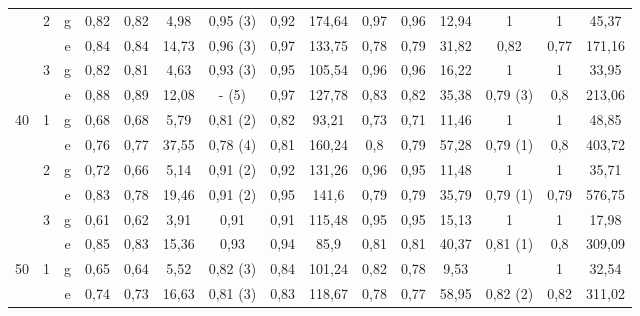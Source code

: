 \begin{table}[htbp]
{\begin{tabular}{|c|c|c|ccc|ccc|ccc|ccc|}
\cline{2-15}          & \multirow{2}[2]{*}{2} & g     & 0,82  & 0,82  & 4,98  & \textcolor[rgb]{ 1,  0,  0}{0,95 (3)} & 0,92  & 174,64 & 0,97  & 0,96  & 12,94 & 1     & 1     & 45,37 \bigstrut[t]\\
          &       & e     & 0,84  & 0,84  & 14,73 & \textcolor[rgb]{ 1,  0,  0}{0,96 (3)} & 0,97  & 133,75 & 0,78  & 0,79  & 31,82 & 0,82  & 0,77  & 171,16 \bigstrut[b]\\
\cline{2-15}          & \multirow{2}[2]{*}{3} & g     & 0,82  & 0,81  & 4,63  & \textcolor[rgb]{ 1,  0,  0}{0,93 (3)} & 0,95  & 105,54 & 0,96  & 0,96  & 16,22 & 1     & 1     & 33,95 \bigstrut[t]\\
          &       & e     & 0,88  & 0,89  & 12,08 & \textcolor[rgb]{ 1,  0,  0}{- (5)} & 0,97  & 127,78 & 0,83  & 0,82  & 35,38 & \textcolor[rgb]{ 1,  0,  0}{0,79 (3)} & 0,8   & 213,06 \bigstrut[b]\\
    \hline
    \hline
    \multirow{6}[6]{*}{40} & \multirow{2}[2]{*}{1} & g     & 0,68  & 0,68  & 5,79  & \textcolor[rgb]{ 1,  0,  0}{0,81 (2)} & 0,82  & 93,21 & 0,73  & 0,71  & 11,46 & 1     & 1     & 48,85 \bigstrut[t]\\
          &       & e     & 0,76  & 0,77  & 37,55 & \textcolor[rgb]{ 1,  0,  0}{0,78 (4)} & 0,81  & 160,24 & 0,8   & 0,79  & 57,28 & \textcolor[rgb]{ 1,  0,  0}{0,79 (1)} & 0,8   & 403,72 \bigstrut[b]\\
\cline{2-15}          & \multirow{2}[2]{*}{2} & g     & 0,72  & 0,66  & 5,14  & \textcolor[rgb]{ 1,  0,  0}{0,91 (2)} & 0,92  & 131,26 & 0,96  & 0,95  & 11,48 & 1     & 1     & 35,71 \bigstrut[t]\\
          &       & e     & 0,83  & 0,78  & 19,46 & \textcolor[rgb]{ 1,  0,  0}{0,91 (2)} & 0,95  & 141,6 & 0,79  & 0,79  & 35,79 & \textcolor[rgb]{ 1,  0,  0}{0,79 (1)} & 0,79  & 576,75 \bigstrut[b]\\
\cline{2-15}          & \multirow{2}[2]{*}{3} & g     & 0,61  & 0,62  & 3,91  & 0,91  & 0,91  & 115,48 & 0,95  & 0,95  & 15,13 & 1     & 1     & 17,98 \bigstrut[t]\\
          &       & e     & 0,85  & 0,83  & 15,36 & 0,93  & 0,94  & 85,9  & 0,81  & 0,81  & 40,37 & \textcolor[rgb]{ 1,  0,  0}{0,81 (1)} & 0,8   & 309,09 \bigstrut[b]\\
    \hline
    \hline
    \multirow{6}[6]{*}{50} & \multirow{2}[2]{*}{1} & g     & 0,65  & 0,64  & 5,52  & \textcolor[rgb]{ 1,  0,  0}{0,82 (3)} & 0,84  & 101,24 & 0,82  & 0,78  & 9,53  & 1     & 1     & 32,54 \bigstrut[t]\\
          &       & e     & 0,74  & 0,73  & 16,63 & \textcolor[rgb]{ 1,  0,  0}{0,81 (3)} & 0,83  & 118,67 & 0,78  & 0,77  & 58,95 & \textcolor[rgb]{ 1,  0,  0}{0,82 (2)} & 0,82  & 311,02 \bigstrut[b]\\

\end{tabular}}
\end{table}
